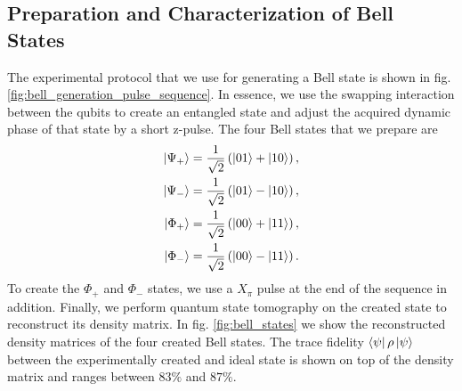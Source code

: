 \subsection{Preparation and Characterization of Bell States}


The experimental protocol that we use for generating a Bell state is shown in fig. \ref{fig:bell_generation_pulse_sequence}. In essence, we use the swapping interaction between the qubits to create an entangled state and adjust the acquired dynamic phase of that state by a short z-pulse. The four Bell states that we prepare are
%
\begin{eqnarray}
\left| \Psi_+ \right> = \frac{1}{\sqrt{2}}\left(\left| 01 \right>+\left| 10 \right>\right), \\
\left| \Psi_- \right> = \frac{1}{\sqrt{2}}\left(\left| 01 \right>-\left| 10 \right>\right), \\
\left| \Phi_+ \right> = \frac{1}{\sqrt{2}}\left(\left| 00 \right>+\left| 11 \right>\right), \\
\left| \Phi_- \right> = \frac{1}{\sqrt{2}}\left(\left| 00 \right>-\left| 11 \right>\right).
\end{eqnarray}
%
To create the $\Phi_+$ and $\Phi_-$ states, we use a $X_\pi$ pulse at the end of the sequence in addition. Finally, we perform quantum state tomography on the created state to reconstruct its density matrix. In fig. \ref{fig:bell_states} we show the reconstructed density matrices of the four created Bell states. The trace fidelity $\left< \psi \right|\rho\left| \psi \right>$ between the experimentally created and ideal state is shown on top of the density matrix and ranges between $83 \%$ and $87 \%$.

